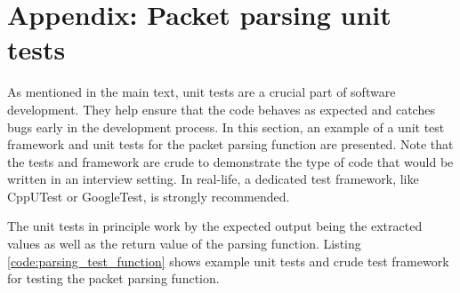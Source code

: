 \documentclass[main.tex]{subfiles}
\begin{document}
\section{Appendix: Packet parsing unit tests} \label{appendix:packet_parsing_tests}
As mentioned in the main text, unit tests are a crucial part of software development. They help ensure that the code behaves as expected and catches bugs early in the development process. In this section, an example of a unit test framework and unit tests for the packet parsing function are presented. Note that the tests and framework are crude to demonstrate the type of code that would be written in an interview setting. In real-life, a dedicated test framework, like CppUTest or GoogleTest, is strongly recommended. \newline

\newnoindentpara The unit tests in principle work by the expected output being the extracted values as well as the return value of the parsing function. Listing \ref{code:parsing_test_function} shows example unit tests and crude test framework for testing the packet parsing function.


\end{document}
